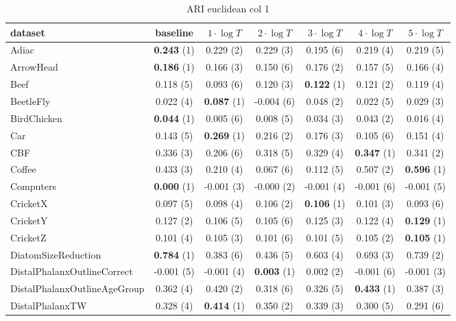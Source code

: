 \begin{table}[ht]
\caption{ARI euclidean col 1} 
\begin{adjustbox}{width=\textwidth}
\begin{tabular}{lcccccc}
\hline
dataset & baseline & \textbf{$1\cdot \log{T}$} & \textbf{$2\cdot \log{T}$} & \textbf{$3\cdot \log{T}$} & \textbf{$4\cdot \log{T}$} & \textbf{$5\cdot \log{T}$} \\ \hline
Adiac & \textbf{0.243} (1) & 0.229 (2) & 0.229 (3) & 0.195 (6) & 0.219 (4) & 0.219 (5) \\
ArrowHead & \textbf{0.186} (1) & 0.166 (3) & 0.150 (6) & 0.176 (2) & 0.157 (5) & 0.166 (4) \\
Beef & 0.118 (5) & 0.093 (6) & 0.120 (3) & \textbf{0.122} (1) & 0.121 (2) & 0.119 (4) \\
BeetleFly & 0.022 (4) & \textbf{0.087} (1) & -0.004 (6) & 0.048 (2) & 0.022 (5) & 0.029 (3) \\
BirdChicken & \textbf{0.044} (1) & 0.005 (6) & 0.008 (5) & 0.034 (3) & 0.043 (2) & 0.016 (4) \\
Car & 0.143 (5) & \textbf{0.269} (1) & 0.216 (2) & 0.176 (3) & 0.105 (6) & 0.151 (4) \\
CBF & 0.336 (3) & 0.206 (6) & 0.318 (5) & 0.329 (4) & \textbf{0.347} (1) & 0.341 (2) \\
Coffee & 0.433 (3) & 0.210 (4) & 0.067 (6) & 0.112 (5) & 0.507 (2) & \textbf{0.596} (1) \\
Computers & \textbf{0.000} (1) & -0.001 (3) & -0.000 (2) & -0.001 (4) & -0.001 (6) & -0.001 (5) \\
CricketX & 0.097 (5) & 0.098 (4) & 0.106 (2) & \textbf{0.106} (1) & 0.101 (3) & 0.093 (6) \\
CricketY & 0.127 (2) & 0.106 (5) & 0.105 (6) & 0.125 (3) & 0.122 (4) & \textbf{0.129} (1) \\
CricketZ & 0.101 (4) & 0.105 (3) & 0.101 (6) & 0.101 (5) & 0.105 (2) & \textbf{0.105} (1) \\
DiatomSizeReduction & \textbf{0.784} (1) & 0.383 (6) & 0.436 (5) & 0.603 (4) & 0.693 (3) & 0.739 (2) \\
DistalPhalanxOutlineCorrect & -0.001 (5) & -0.001 (4) & \textbf{0.003} (1) & 0.002 (2) & -0.001 (6) & -0.001 (3) \\
DistalPhalanxOutlineAgeGroup & 0.362 (4) & 0.420 (2) & 0.318 (6) & 0.326 (5) & \textbf{0.433} (1) & 0.387 (3) \\
DistalPhalanxTW & 0.328 (4) & \textbf{0.414} (1) & 0.350 (2) & 0.339 (3) & 0.300 (5) & 0.291 (6) \\

\end{tabular}
\end{adjustbox}
\end{table}
